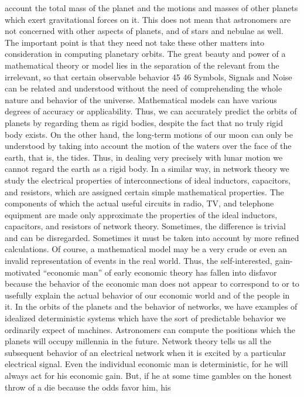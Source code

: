 account the total mass of the planet and the motions and masses
of other planets which exert gravitational forces on it.
This does not mean that astronomers are not concerned with
other aspects of planets, and of stars and nebulae as well. The
important point is that they need not take these other matters into
consideration in computing planetary orbits. The great beauty and
power of a mathematical theory or model lies in the separation of
the relevant from the irrelevant, so that certain observable behavior
45
46
Symbols, Signals and Noise
can be related and understood without the need of comprehending
the whole nature and behavior of the universe.
Mathematical models can have various degrees of accuracy or
applicability. Thus, we can accurately predict the orbits of planets
by regarding them as rigid bodies, despite the fact that no truly
rigid body exists. On the other hand, the long-term motions of our
moon can only be understood by taking into account the motion
of the waters over the face of the earth, that is, the tides. Thus, in
dealing very precisely with lunar motion we cannot regard the
earth as a rigid body.
In a similar way, in network theory we study the electrical
properties of interconnections of ideal inductors, capacitors, and
resistors, which are assigned certain simple mathematical properties.
The components of which the actual useful circuits in radio,
TV, and telephone equipment are made only approximate the
properties of the ideal inductors, capacitors, and resistors of network
theory. Sometimes, the difference is trivial and can be disregarded.
Sometimes it must be taken into account by more refined
calculations.
Of course, a mathematical model may be a very crude or even
an invalid representation of events in the real world. Thus, the
self-interested, gain-motivated “economic man” of early economic
theory has fallen into disfavor because the behavior of the economic
man does not appear to correspond to or to usefully explain
the actual behavior of our economic world and of the people in it.
In the orbits of the planets and the behavior of networks, we
have examples of idealized deterministic systems which have the
sort of predictable behavior we ordinarily expect of machines.
Astronomers can compute the positions which the planets will
occupy millennia in the future. Network theory tells us all the
subsequent behavior of an electrical network when it is excited by
a particular electrical signal.
Even the individual economic man is deterministic, for he will
always act for his economic gain. But, if he at some time gambles
on the honest throw of a die because the odds favor him, his
